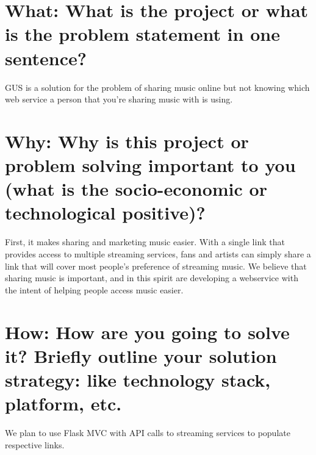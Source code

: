 \section*{What: What is the project or what is the problem statement in one sentence?}
\doublespacing

GUS is a solution for the problem of sharing music online but not knowing which web service a person that you're sharing music with is using.  
 
\singlespacing
\section*{Why: Why is this project or problem solving important to you (what is the socio-economic or technological positive)?}
\doublespacing

First, it makes sharing and marketing music easier. With a single link that provides access to multiple streaming services, fans and artists can simply share a link that will cover most people's preference of streaming music. We believe that sharing music is important, and in this spirit are developing a webservice with the intent of helping people access music easier.

\singlespacing
\section*{How: How are you going to solve it? Briefly outline your solution strategy: like technology stack, platform, etc.}
\doublespacing

We plan to use Flask MVC with API calls to streaming services to populate respective links.
